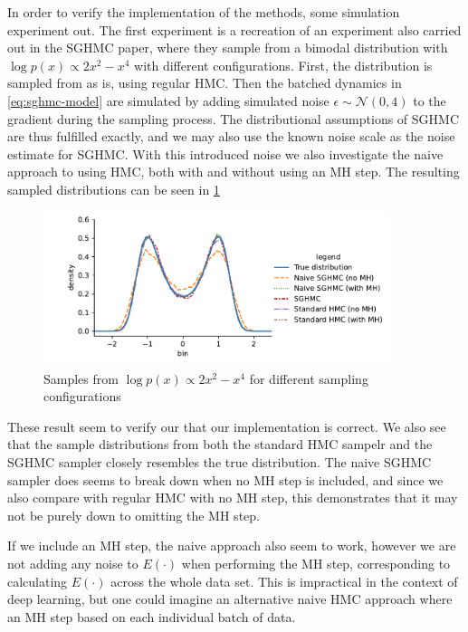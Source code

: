 In order to verify the implementation of the methods, some simulation experiment out. 
The first experiment is a recreation of an experiment also carried out in the SGHMC paper, where they sample from a bimodal distribution with $\log p(x) \propto 2 x^2 - x^ 4$ with different configurations. 
First, the distribution is sampled from as is, using regular HMC. Then the batched dynamics in \cref{eq:sghmc-model} are simulated by adding simulated noise $\epsilon \sim \mathcal{N}(0, 4)$ to the gradient during the sampling process. 
The distributional assumptions of SGHMC are thus fulfilled exactly, and we may also use the known noise scale as the noise estimate for SGHMC. 
With this introduced noise we also investigate the naive approach to using HMC, both with and without using an MH step. 
The resulting sampled distributions can be seen in \cref{fig:synthetic}
\begin{figure}[htbp]
    \centering
    \includegraphics[width=0.9\textwidth]{Figures/synthetic.pdf}
    \caption{Samples from $\log p(x) \propto 2 x^2 - x^ 4$ for different sampling configurations}
    \label{fig:synthetic}
\end{figure}
These result seem to verify our that our implementation is correct. We also see that the sample distributions from both the standard HMC sampelr and the SGHMC sampler closely resembles the true distribution. 
The naive SGHMC sampler does seems to break down when no MH step is included, and since we also compare with regular HMC with no MH step, this demonstrates that it may not be purely down to omitting the MH step. 

If we include an MH step, the naive approach also seem to work, however we are not adding any noise to $E(\cdot)$ when performing the MH step, corresponding to calculating $E(\cdot)$ across the whole data set. 
This is impractical in the context of deep learning, but one could imagine an alternative naive HMC approach where an MH step based on each individual batch of data. 

